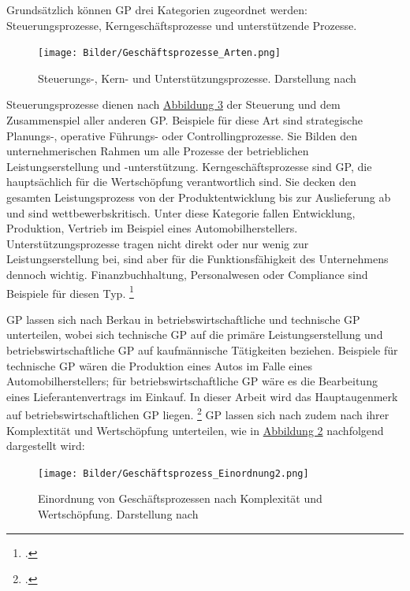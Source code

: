 Grundsätzlich können GP drei Kategorien zugeordnet werden: Steuerungsprozesse, Kerngeschäftsprozesse und unterstützende Prozesse.

\begin{figure}[H]
    \centering
    \texttt{[image: Bilder/Geschäftsprozesse\_Arten.png]}
    \caption[Steuerungs-, Kern- und Unterstützungsprozesse]{Steuerungs-, Kern- und Unterstützungsprozesse. Darstellung nach \cite[][S. 44]{theorie_gadatsch_grundkurs_geschäftsprozessmanagement_2010}}
    \label{fig:Geschäftsprozesse_Arten}
\end{figure}

Steuerungsprozesse dienen nach \hyperref[fig:Geschäftsprozesse_Arten]{Abbildung 3} der Steuerung und dem Zusammenspiel aller anderen GP. Beispiele für diese Art sind strategische Planungs-, operative Führungs- oder Controllingprozesse. Sie Bilden den unternehmerischen Rahmen um alle Prozesse der betrieblichen Leistungserstellung und -unterstützung. Kerngeschäftsprozesse sind GP, die hauptsächlich für die Wertschöpfung verantwortlich sind. Sie decken den gesamten Leistungsprozess von der Produktentwicklung bis zur Auslieferung ab und sind wettbewerbskritisch. Unter diese Kategorie fallen \zB Entwicklung, Produktion, Vertrieb im Beispiel eines Automobilherstellers. Unterstützungsprozesse tragen nicht direkt oder nur wenig zur Leistungserstellung bei, sind aber für die Funktionsfähigkeit des Unternehmens dennoch wichtig. Finanzbuchhaltung, Personalwesen oder Compliance sind Beispiele für diesen Typ. \footcite[Vgl.][S. 44]{theorie_gadatsch_grundkurs_geschäftsprozessmanagement_2010}

GP lassen sich nach Berkau in betriebswirtschaftliche und technische GP unterteilen, wobei sich technische GP auf die primäre Leistungserstellung und betriebswirtschaftliche GP auf kaufmännische Tätigkeiten beziehen. \parencite[Vgl.][S. 27]{theorie_berkau_arten_geschäftsprozesse_1998} Beispiele für technische GP wären die Produktion eines Autos im Falle eines Automobilherstellers; für betriebswirtschaftliche GP wäre es die Bearbeitung eines Lieferantenvertrags im Einkauf. In dieser Arbeit wird das Hauptaugenmerk auf betriebswirtschaftlichen GP liegen. \footcite[Vgl.][S. 10]{theorie_staud_geschäftsprozessanalyse_2006} GP lassen sich nach zudem nach ihrer Komplextität und Wertschöpfung unterteilen, wie in \hyperref[fig:Geschäftsprozess_Einordnung2]{Abbildung 2} nachfolgend dargestellt wird:

\begin{figure}[H]
    \centering
    \texttt{[image: Bilder/Geschäftsprozess\_Einordnung2.png]}
    \caption[Einordnung von Geschäftsprozessen nach Komplexität und Wertschöpfung]{Einordnung von Geschäftsprozessen nach Komplexität und Wertschöpfung. Darstellung nach \cite{theorie_riekhof_geschäftsprozess_einordnung_1997}}
    \label{fig:Geschäftsprozess_Einordnung2}
\end{figure}

